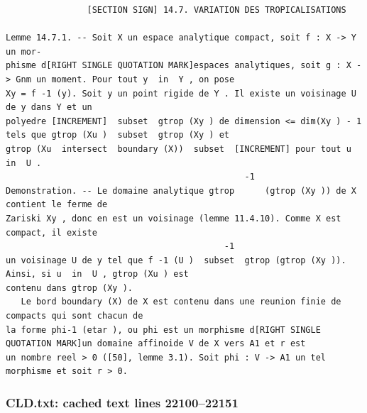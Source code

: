 \documentclass[
  11pt,
]{article}
\begin{document}
\begin{lstlisting}
                [SECTION SIGN] 14.7. VARIATION DES TROPICALISATIONS

Lemme 14.7.1. -- Soit X un espace analytique compact, soit f : X -> Y un mor-
phisme d[RIGHT SINGLE QUOTATION MARK]espaces analytiques, soit g : X -> Gnm un moment. Pour tout y  in  Y , on pose
Xy = f -1 (y). Soit y un point rigide de Y . Il existe un voisinage U de y dans Y et un
polyedre [INCREMENT]  subset  gtrop (Xy ) de dimension <= dim(Xy ) - 1 tels que gtrop (Xu )  subset  gtrop (Xy ) et
gtrop (Xu  intersect  boundary (X))  subset  [INCREMENT] pour tout u  in  U .
                                               -1
Demonstration. -- Le domaine analytique gtrop      (gtrop (Xy )) de X contient le ferme de
Zariski Xy , donc en est un voisinage (lemme 11.4.10). Comme X est compact, il existe
                                           -1
un voisinage U de y tel que f -1 (U )  subset  gtrop (gtrop (Xy )). Ainsi, si u  in  U , gtrop (Xu ) est
contenu dans gtrop (Xy ).
   Le bord boundary (X) de X est contenu dans une reunion finie de compacts qui sont chacun de
la forme phi-1 (etar ), ou phi est un morphisme d[RIGHT SINGLE QUOTATION MARK]un domaine affinoide V de X vers A1 et r est
un nombre reel > 0 ([50], lemme 3.1). Soit phi : V -> A1 un tel morphisme et soit r > 0.
\end{lstlisting}

\subsubsection{CLD.txt: cached text lines
22100--22151}\label{cld.txt-cached-text-lines-2210022151}
\end{document}
